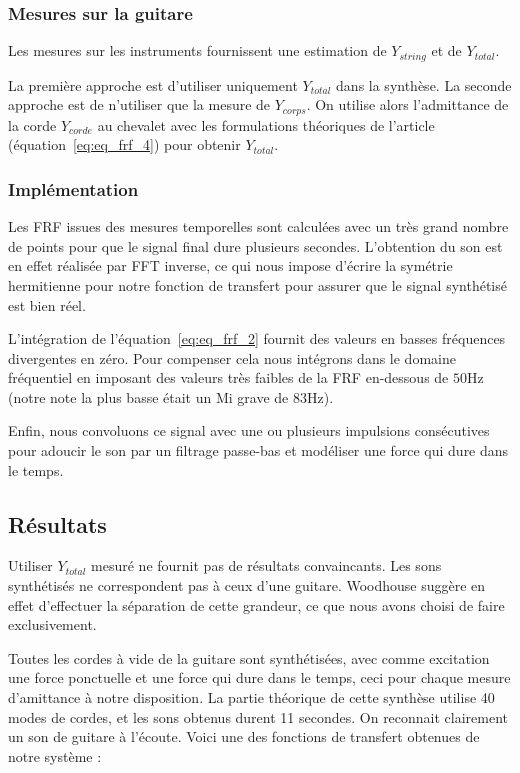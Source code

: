 \subsubsection{Mesures sur la guitare}
Les mesures sur les instruments fournissent une estimation de $Y_{string}$ et de $Y_{total}$.

La première approche est d'utiliser uniquement $Y_{total}$ dans la synthèse. La seconde approche est de n'utiliser que la mesure de $Y_{corps}$. On utilise alors l'admittance de la corde $Y_{corde}$ au chevalet avec les formulations théoriques de l'article (équation~\ref{eq:eq_frf_4}) pour obtenir $Y_{total}$.

\subsubsection{Implémentation}
Les FRF issues des mesures temporelles sont calculées avec un très grand nombre de points pour que le signal final dure plusieurs secondes. L'obtention du son est en effet réalisée par FFT inverse, ce qui nous impose d'écrire la symétrie hermitienne pour notre fonction de transfert pour assurer que le signal synthétisé est bien réel.

L'intégration de l'équation~\ref{eq:eq_frf_2} fournit des valeurs en basses fréquences divergentes en zéro. Pour compenser cela nous intégrons dans le domaine fréquentiel en imposant des valeurs très faibles de la FRF en-dessous de \( \si{50\Hz} \) (notre note la plus basse était un Mi grave de \( \si{83\Hz} \)).

Enfin, nous convoluons ce signal avec une ou plusieurs impulsions consécutives pour adoucir le son par un filtrage passe-bas et modéliser une force qui dure dans le temps.

\subsection{Résultats}
%

Utiliser $Y_{total}$ mesuré ne fournit pas de résultats convaincants. Les sons synthétisés ne correspondent pas à ceux d'une guitare. Woodhouse suggère en effet d'effectuer la séparation de cette grandeur, ce que nous avons choisi de faire exclusivement.

Toutes les cordes à vide de la guitare sont synthétisées, avec comme excitation une force ponctuelle et une force qui dure dans le temps, ceci pour chaque mesure d'amittance à notre disposition. La partie théorique de cette synthèse utilise 40 modes de cordes, et les sons obtenus durent 11 secondes. On reconnait clairement un son de guitare à l'écoute. Voici une des fonctions de transfert obtenues de notre système :

